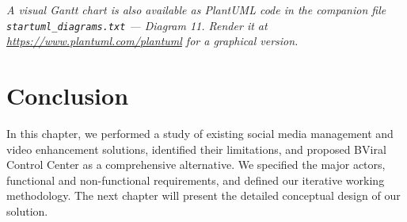 \noindent\textit{A visual Gantt chart is also available as PlantUML code in the companion file \texttt{startuml\_diagrams.txt} --- Diagram 11. Render it at \url{https://www.plantuml.com/plantuml} for a graphical version.}

\section*{Conclusion}
In this chapter, we performed a study of existing social media management and video enhancement solutions, identified their limitations, and proposed BViral Control Center as a comprehensive alternative. We specified the major actors, functional and non-functional requirements, and defined our iterative working methodology. The next chapter will present the detailed conceptual design of our solution.
